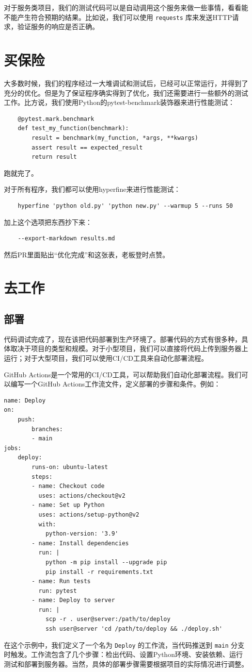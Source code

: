 对于服务类项目，我们的测试代码可以是自动调用这个服务来做一些事情，看看能不能产生符合预期的结果。比如说，我们可以使用 \texttt{requests} 库来发送HTTP请求，验证服务的响应是否正确。

\section{买保险}

大多数时候，我们的程序经过一大堆调试和测试后，已经可以正常运行，并得到了充分的优化。但是为了保证程序确实得到了优化，我们还需要进行一些额外的测试工作。比方说，我们使用Python的pytest-benchmark装饰器来进行性能测试：
\begin{verbatim}
    @pytest.mark.benchmark
    def test_my_function(benchmark):
        result = benchmark(my_function, *args, **kwargs)
        assert result == expected_result
        return result
\end{verbatim}
跑就完了。

对于所有程序，我们都可以使用hyperfine来进行性能测试：
\begin{verbatim}
    hyperfine 'python old.py' 'python new.py' --warmup 5 --runs 50
\end{verbatim}
加上这个选项把东西抄下来：
\begin{verbatim}
    --export-markdown results.md
\end{verbatim}
然后PR里面贴出“优化完成”和这张表，老板登时点赞。

\section{去工作}

\subsection{部署}

代码调试完成了，现在该把代码部署到生产环境了。部署代码的方式有很多种，具体取决于项目的类型和规模。对于小型项目，我们可以直接将代码上传到服务器上运行；对于大型项目，我们可以使用CI/CD工具来自动化部署流程。

GitHub Actions是一个常用的CI/CD工具，可以帮助我们自动化部署流程。我们可以编写一个GitHub Actions工作流文件，定义部署的步骤和条件。例如：
\begin{verbatim}
name: Deploy
on:
    push:
        branches:
        - main
jobs:
    deploy:
        runs-on: ubuntu-latest
        steps:
        - name: Checkout code
          uses: actions/checkout@v2
        - name: Set up Python
          uses: actions/setup-python@v2
          with:
            python-version: '3.9'
        - name: Install dependencies
          run: |
            python -m pip install --upgrade pip
            pip install -r requirements.txt
        - name: Run tests
          run: pytest
        - name: Deploy to server
          run: |
            scp -r . user@server:/path/to/deploy
            ssh user@server 'cd /path/to/deploy && ./deploy.sh'
\end{verbatim}
在这个示例中，我们定义了一个名为 \texttt{Deploy} 的工作流，当代码推送到 \texttt{main} 分支时触发。工作流包含了几个步骤：检出代码、设置Python环境、安装依赖、运行测试和部署到服务器。当然，具体的部署步骤需要根据项目的实际情况进行调整。

